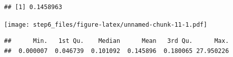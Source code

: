 \documentclass[sigchi]{acmart}
\newenvironment{Shaded}{\begin{snugshade}}{\end{snugshade}}
\newcommand{\KeywordTok}[1]{\textcolor[rgb]{0.13,0.29,0.53}{\textbf{#1}}}
\newcommand{\NormalTok}[1]{#1}
\newcommand{\OperatorTok}[1]{\textcolor[rgb]{0.81,0.36,0.00}{\textbf{#1}}}
\newcommand{\StringTok}[1]{\textcolor[rgb]{0.31,0.60,0.02}{#1}}
\begin{document}
\begin{verbatim}
## [1] 0.1458963
\end{verbatim}

\begin{Shaded}
\end{Shaded}

\texttt{[image: step6\_files/figure-latex/unnamed-chunk-11-1.pdf]}

\begin{Shaded}
\end{Shaded}

\begin{verbatim}
##      Min.   1st Qu.    Median      Mean   3rd Qu.      Max. 
##  0.000007  0.046739  0.101092  0.145896  0.180065 27.950226
\end{verbatim}
\end{document}

